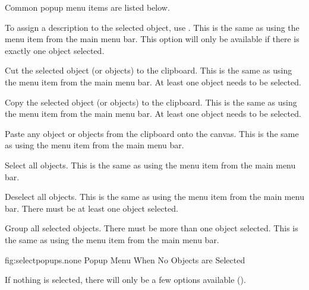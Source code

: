Common popup menu items are listed below.


To assign a description to the selected \gls{object}, use
. This is the same as using the
 menu item from the main menu bar.
This option will only be available if there is exactly one
\gls{object} selected.


Cut the selected \gls{object} (or \glspl{object}) to the clipboard.
This is the same as using the  menu item from the
main menu bar. At least one \gls{object} needs to be selected.


Copy the selected \gls{object} (or \glspl{object}) to the clipboard.
This is the same as using the  menu item from the
main menu bar. At least one \gls{object} needs to be selected.


Paste any \gls{object} or \glspl{object} from the clipboard onto the
\gls{canvas}.
This is the same as using the  menu item from the
main menu bar.


Select all \glspl{object}.
This is the same as using the  menu item from the
main menu bar.


Deselect all \glspl{object}.
This is the same as using the  menu item from the
main menu bar. There must be at least one \gls{object} selected.


Group all selected \glspl{object}. There must be more than one
object selected.
This is the same as using the  menu item from the
main menu bar.



\FloatFig
  {fig:selectpopups.none}
  {}
  {Popup Menu When No Objects are Selected}

If nothing is selected, there will only be a few options available
().


